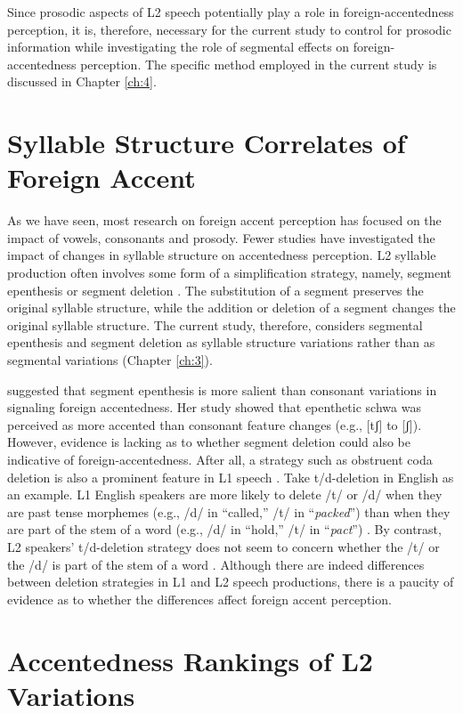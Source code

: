 Since prosodic aspects of L2 speech potentially play a role in foreign-accentedness perception, it is, therefore, necessary for the current study to control for prosodic information while investigating the role of segmental effects on foreign-accentedness perception. The specific method employed in the current study is discussed in Chapter \ref{ch:4}.

\section{Syllable Structure Correlates of Foreign Accent}

As we have seen, most research on foreign accent perception has focused on the impact of vowels, consonants and prosody. Fewer studies have investigated the impact of changes in syllable structure on accentedness perception. L2 syllable production often involves some form of a simplification strategy, namely, segment epenthesis or segment deletion \citep{Sato_1984, Hansen_2004}. The substitution of a segment preserves the original syllable structure, while the addition or deletion of a segment changes the original syllable structure. The current study, therefore, considers segmental epenthesis and segment deletion as syllable structure variations rather than as segmental variations (Chapter \ref{ch:3}). 

\citet{Magen_1998} suggested that segment epenthesis is more salient than consonant variations in signaling foreign accentedness. Her study showed that epenthetic schwa was perceived as more accented than consonant feature changes (e.g., [tʃ] to [ʃ]). However, evidence is lacking as to whether segment deletion could also be indicative of foreign-accentedness. After all, a strategy such as obstruent coda deletion is also a prominent feature in L1 speech \citep{Labov_1997, Demuth_2006}. Take t/d-deletion in English as an example. L1 English speakers are more likely to delete /t/ or /d/ when they are past tense morphemes (e.g., /d/ in “called,” /t/ in “\textit{packed}”) than when they are part of the stem of a word (e.g., /d/ in “hold,” /t/ in “\textit{pact}”) \citep{Guy_1991}. By contrast, L2 speakers’ t/d-deletion strategy does not seem to concern whether the /t/ or the /d/ is part of the stem of a word \citep{Hansen_2004, Edwards_2011}. Although there are indeed differences between deletion strategies in L1 and L2 speech productions, there is a paucity of evidence as to whether the differences affect foreign accent perception. 

\section{Accentedness Rankings of L2 Variations}

